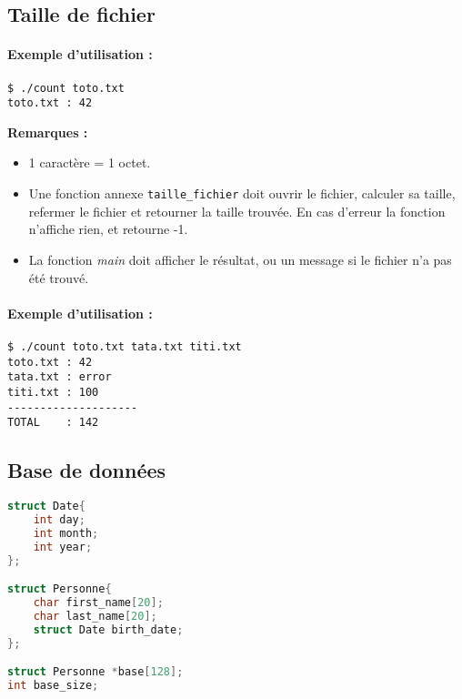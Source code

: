 \subsection{Taille de fichier}


\paragraph*{Exemple d'utilisation :}
\begin{verbatim}
$ ./count toto.txt
toto.txt : 42
\end{verbatim}

\textbf{Remarques :}
\begin{itemize}
\item 1 caractère = 1 octet.
\item Une fonction annexe \texttt{taille\_fichier} doit ouvrir le fichier, calculer sa taille, 
refermer le fichier et retourner la taille trouvée. En cas d'erreur
la fonction n'affiche rien, et retourne -1.
\item La fonction \textit{main} doit afficher le résultat, ou un message
si le fichier n'a pas été trouvé.
\end{itemize}

\vspace{1cm}


\paragraph*{Exemple d'utilisation :}

\begin{verbatim}
$ ./count toto.txt tata.txt titi.txt
toto.txt : 42
tata.txt : error
titi.txt : 100
--------------------
TOTAL    : 142
\end{verbatim}


\subsection{Base de données}
\begin{lstlisting}[language=c]
struct Date{
	int day;
	int month;
	int year;
};

struct Personne{
	char first_name[20];
	char last_name[20];
	struct Date birth_date;
};

struct Personne *base[128];
int base_size;
\end{lstlisting}

